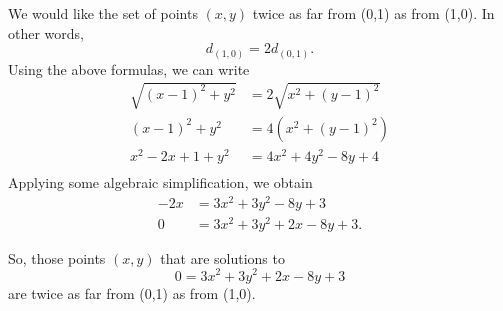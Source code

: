 \documentclass[12pt]{amsart}
\theoremstyle{case}
\begin{document}
		We would like the set of points $(x,y)$ twice as far from (0,1) as from (1,0). In other words,
		$$ d_{(1,0)} = 2d_{(0,1)} . $$
		Using the above formulas, we can write
		\begin{equation*}
		\begin{split}
		\sqrt{(x-1)^2 + y^2} & = 2 \sqrt{x^2 + (y-1)^2} \\
		(x-1)^2 + y^2 & = 4 (x^2 + (y-1)^2) \\
		x^2 - 2x + 1 + y^2 & = 4x^2 + 4y^2 - 8y + 4 \\
		\end{split}
		\end{equation*}
		Applying some algebraic simplification, we obtain
		\begin{equation*}
		\begin{split}
		-2x & = 3x^2 + 3y^2 - 8y + 3 \\
		0 & = 3x^2 + 3y^2 + 2x - 8y + 3 .
		\end{split}
		\end{equation*}
		
		So, those points $(x,y)$ that are solutions to 
		$$0 = 3x^2 + 3y^2 + 2x - 8y + 3$$
		are twice as far from (0,1) as from (1,0).
	
	
	
	
	
	
	
	
	
	
	
	
	
	
	
	
	
	
	
	
	
	
	
	
\end{document}
